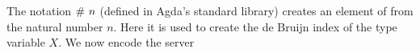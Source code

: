 The notation $\AgdaFunction{\#}~n$ (defined in Agda's standard library) creates
an element of  from the natural number $n$. Here it is used to
create the de Bruijn index of the type variable $X$.
%
We now encode the server
\begin{code}%
\>[0]\AgdaSpace{}%
\AgdaSymbol{:}\AgdaSpace{}%
\AgdaSpace{}%
\AgdaOperator{\AgdaFunction{[}}\AgdaSpace{}%
\AgdaSpace{}%
\AgdaOperator{\AgdaFunction{]}}\<%
\\
\>[0]\AgdaSpace{}%
\AgdaSymbol{=}%
\>[240I]\AgdaSpace{}%
\AgdaSymbol{(}\AgdaSpace{}%
\AgdaSpace{}%
\AgdaSpace{}%
\AgdaSymbol{(}\AgdaOperator{\AgdaInductiveConstructor{<}}\AgdaSpace{}%
\AgdaSymbol{))}\AgdaSpace{}%
\AgdaSpace{}%
\AgdaOperator{\AgdaFunction{\$}}\<%
\\
\>[.][@{}l@{}]\<[240I]%
\>[9]\AgdaSpace{}%
\AgdaSpace{}%
\AgdaSpace{}%
\AgdaSymbol{(}\AgdaOperator{\AgdaInductiveConstructor{<}}\AgdaSpace{}%
\AgdaSymbol{)}\AgdaSpace{}%
\AgdaSpace{}%
\AgdaSpace{}%
\<%
\\
%
\>[9]\AgdaSpace{}%
\AgdaSpace{}%
\AgdaSpace{}%
\AgdaSymbol{(}\AgdaOperator{\AgdaInductiveConstructor{<}}\AgdaSpace{}%
\AgdaSymbol{)}\AgdaSpace{}%
\AgdaOperator{\AgdaFunction{\$}}\<%
\\
%
\>[9]\AgdaSpace{}%
\AgdaSymbol{(}\AgdaSpace{}%
\AgdaSpace{}%
\AgdaSpace{}%
\AgdaSymbol{(}\AgdaOperator{\AgdaInductiveConstructor{<}}\AgdaSpace{}%
\AgdaSymbol{))}\AgdaSpace{}%
\AgdaSymbol{(}\AgdaSpace{}%
\AgdaSpace{}%
\AgdaSpace{}%
\AgdaSymbol{(}\AgdaOperator{\AgdaInductiveConstructor{<}}\AgdaSpace{}%
\AgdaOperator{\AgdaInductiveConstructor{>}}\AgdaSpace{}%
\AgdaSymbol{)}\AgdaSpace{}%
\AgdaSymbol{)}\AgdaSpace{}%
\AgdaSymbol{(}\AgdaOperator{\AgdaInductiveConstructor{<}}\AgdaSpace{}%
\AgdaSymbol{)}\AgdaSpace{}%
\AgdaOperator{\AgdaFunction{\$}}\<%
\\
%
\>[9]\AgdaSpace{}%
\<%
\end{code}

